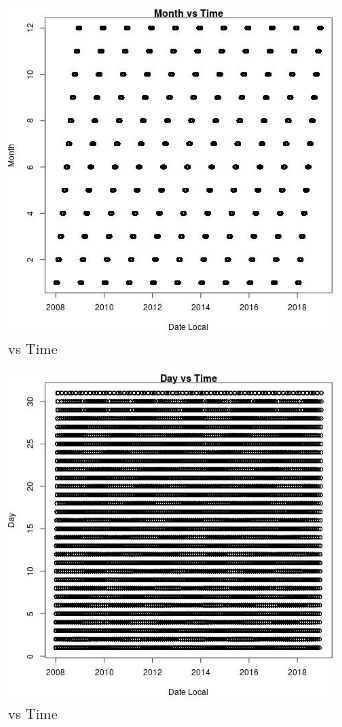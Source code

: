 \begin{figure} 
\centering  
\includegraphics[width=0.77\textwidth]{Code_Outputs/Report_PM25_Step4_part_e_de_duplicated_aves_ML_input_MonthvDate_Local.jpg} 
\caption{\label{fig:Report_PM25_Step4_part_e_de_duplicated_aves_ML_inputMonthvDate_Local}vs Time} 
\end{figure} 
 

\begin{figure} 
\centering  
\includegraphics[width=0.77\textwidth]{Code_Outputs/Report_PM25_Step4_part_e_de_duplicated_aves_ML_input_DayvDate_Local.jpg} 
\caption{\label{fig:Report_PM25_Step4_part_e_de_duplicated_aves_ML_inputDayvDate_Local}vs Time} 
\end{figure} 
 

